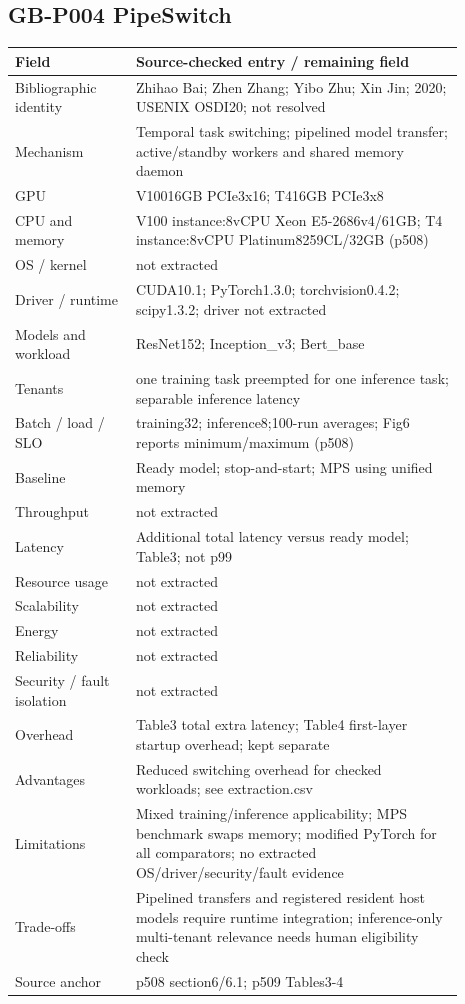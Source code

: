 \documentclass[12pt,a4paper]{article}
\begin{document}
\subsection{GB-P004 PipeSwitch}
\begin{longtable}{p{0.24\linewidth}p{0.65\linewidth}}
\toprule
Field & Source-checked entry /\allowbreak{} remaining field\\\midrule
\endhead
Bibliographic identity & Zhihao Bai; Zhen Zhang; Yibo Zhu; Xin Jin; 2020; USENIX OSDI20; not resolved\\
Mechanism & Temporal task switching; pipelined model transfer; active/\allowbreak{}standby workers and shared memory daemon\\
GPU & V10016GB PCIe3x16; T416GB PCIe3x8\\
CPU and memory & V100 instance:8vCPU Xeon E5-2686v4/\allowbreak{}61GB; T4 instance:8vCPU Platinum8259CL/\allowbreak{}32GB (p508)\\
OS /\allowbreak{} kernel & not extracted\\
Driver /\allowbreak{} runtime & CUDA10.1; PyTorch1.3.0; torchvision0.4.2; scipy1.3.2; driver not extracted\\
Models and workload & ResNet152; Inception\_v3; Bert\_base\\
Tenants & one training task preempted for one inference task; separable inference latency\\
Batch /\allowbreak{} load /\allowbreak{} SLO & training32; inference8;100-run averages; Fig6 reports minimum/\allowbreak{}maximum (p508)\\
Baseline & Ready model; stop-and-start; MPS using unified memory\\
Throughput & not extracted\\
Latency & Additional total latency versus ready model; Table3; not p99\\
Resource usage & not extracted\\
Scalability & not extracted\\
Energy & not extracted\\
Reliability & not extracted\\
Security /\allowbreak{} fault isolation & not extracted\\
Overhead & Table3 total extra latency; Table4 first-layer startup overhead; kept separate\\
Advantages & Reduced switching overhead for checked workloads; see extraction.csv\\
Limitations & Mixed training/\allowbreak{}inference applicability; MPS benchmark swaps memory; modified PyTorch for all comparators; no extracted OS/\allowbreak{}driver/\allowbreak{}security/\allowbreak{}fault evidence\\
Trade-offs & Pipelined transfers and registered resident host models require runtime integration; inference-only multi-tenant relevance needs human eligibility check\\
Source anchor & p508 section6/\allowbreak{}6.1; p509 Tables3-4\\
\bottomrule
\end{longtable}
\end{document}
